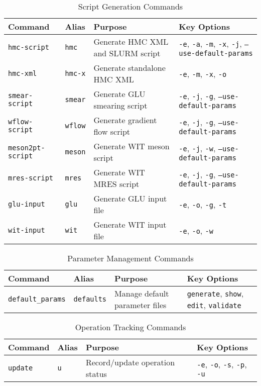 \documentclass{article}
\begin{document}
\begin{table}[h]
\centering
\begin{tabular}{|l|l|l|l|}
\hline
\textbf{Command} & \textbf{Alias} & \textbf{Purpose} & \textbf{Key Options} \\
\hline
\texttt{hmc-script} & \texttt{hmc} & Generate HMC XML and SLURM script & \texttt{-e}, \texttt{-a}, \texttt{-m}, \texttt{-x}, \texttt{-j}, \texttt{--use-default-params} \\
\hline
\texttt{hmc-xml} & \texttt{hmc-x} & Generate standalone HMC XML & \texttt{-e}, \texttt{-m}, \texttt{-x}, \texttt{-o} \\
\hline
\texttt{smear-script} & \texttt{smear} & Generate GLU smearing script & \texttt{-e}, \texttt{-j}, \texttt{-g}, \texttt{--use-default-params} \\
\hline
\texttt{wflow-script} & \texttt{wflow} & Generate gradient flow script & \texttt{-e}, \texttt{-j}, \texttt{-g}, \texttt{--use-default-params} \\
\hline
\texttt{meson2pt-script} & \texttt{meson} & Generate WIT meson script & \texttt{-e}, \texttt{-j}, \texttt{-w}, \texttt{--use-default-params} \\
\hline
\texttt{mres-script} & \texttt{mres} & Generate WIT MRES script & \texttt{-e}, \texttt{-j}, \texttt{-g}, \texttt{--use-default-params} \\
\hline
\texttt{glu-input} & \texttt{glu} & Generate GLU input file & \texttt{-e}, \texttt{-o}, \texttt{-g}, \texttt{-t} \\
\hline
\texttt{wit-input} & \texttt{wit} & Generate WIT input file & \texttt{-e}, \texttt{-o}, \texttt{-w} \\
\hline
\end{tabular}
\caption{Script Generation Commands}
\end{table}


\begin{table}[h]
\centering
\begin{tabular}{|l|l|l|l|}
\hline
\textbf{Command} & \textbf{Alias} & \textbf{Purpose} & \textbf{Key Options} \\
\hline
\texttt{default\_params} & \texttt{defaults} & Manage default parameter files & \texttt{generate}, \texttt{show}, \texttt{edit}, \texttt{validate} \\
\hline
\end{tabular}
\caption{Parameter Management Commands}
\end{table}


\begin{table}[h]
\centering
\begin{tabular}{|l|l|l|l|}
\hline
\textbf{Command} & \textbf{Alias} & \textbf{Purpose} & \textbf{Key Options} \\
\hline
\texttt{update} & \texttt{u} & Record/update operation status & \texttt{-e}, \texttt{-o}, \texttt{-s}, \texttt{-p}, \texttt{-u} \\
\hline
\end{tabular}
\caption{Operation Tracking Commands}
\end{table}
\end{document}
